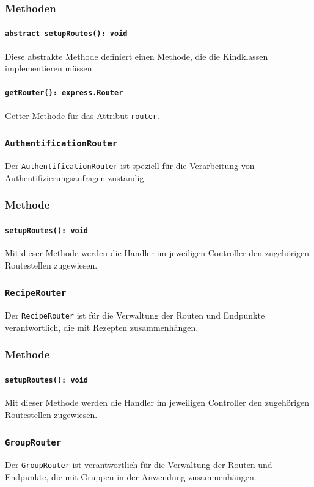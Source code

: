 \documentclass{entwurfsheft}
\begin{document}
\subsubsection*{Methoden}
\paragraph{\texttt{abstract setupRoutes(): void}}
Diese abstrakte Methode definiert einen Methode, die die Kindklassen implementieren müssen.
\paragraph{\texttt{getRouter(): express.Router}}
Getter-Methode für das Attribut \texttt{router}.


\subsubsection{\texttt{AuthentificationRouter}}\label{sec:AuthentificationRouter}
Der \texttt{AuthentificationRouter} ist speziell für die Verarbeitung von Authentifizierungsanfragen zuständig.
\subsubsection*{Methode}
\paragraph{\texttt{setupRoutes(): void}}
Mit dieser Methode werden die Handler im jeweiligen Controller den zugehörigen Routestellen zugewiesen.

\subsubsection{\texttt{RecipeRouter}}\label{sec:RecipeRouter}
Der \texttt{RecipeRouter} ist für die Verwaltung der Routen und Endpunkte verantwortlich, die mit Rezepten zusammenhängen.
\subsubsection*{Methode}
\paragraph{\texttt{setupRoutes(): void}}
Mit dieser Methode werden die Handler im jeweiligen Controller den zugehörigen Routestellen zugewiesen.

\subsubsection{\texttt{GroupRouter}}\label{sec:GroupRouter}
Der \texttt{GroupRouter} ist verantwortlich für die Verwaltung der Routen und Endpunkte, die mit Gruppen in der Anwendung zusammenhängen.
\end{document}
